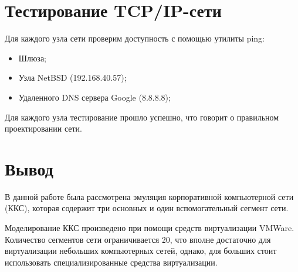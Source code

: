 \documentclass[14pt,a4paper,report]{report}
\begin{document}
\section{Тестирование TCP/IP-сети}

Для каждого узла сети проверим доступность с помощью утилиты ping:

\begin{itemize}
	\item Шлюза;
	\item Узла NetBSD (192.168.40.57);
	\item Удаленного DNS сервера Google (8.8.8.8);
\end{itemize}

Для каждого узла тестирование прошло успешно, что говорит о правильном проектировании сети.

\section{Вывод}

В данной работе была рассмотрена эмуляция корпоративной компьютерной сети (ККС), которая содержит три основных и один вспомогательный сегмент сети.

Моделирование ККС произведено при помощи средств виртуализации VMWare. Количество сегментов сети ограничивается 20, что вполне достаточно для виртуализации небольших компьютерных сетей, однако, для больших стоит использовать специализированные средства виртуализации.
\end{document}
